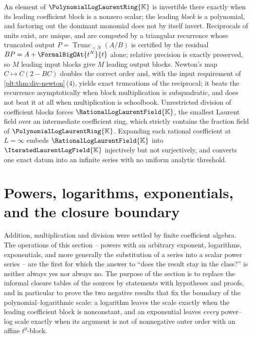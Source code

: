 \documentclass[11pt,oneside]{article}
\theoremstyle{plain}
\theoremstyle{definition}
\theoremstyle{remark}
\newcommand{\K}{\mathbb{K}}
\newcommand{\PLlau}{\PolynomialLogLaurentRing{\K}}       %
\newcommand{\PLrat}{\RationalLogLaurentField{\K}}        %
\newcommand{\PLit}{\IteratedLaurentLogField{\K}}         %
\newcommand{\Trunc}[2]{\operatorname{Trunc}_{<#2}#1}     %
\begin{document}
\begin{summarybox}
An element of \(\PLlau\) is invertible there exactly when its leading
coefficient block is a nonzero scalar; the leading \emph{block} is a
polynomial, and factoring out the dominant monomial does not by itself invert.
Reciprocals of units exist, are unique, and are computed by a triangular
recurrence whose truncated output \(P=\Trunc{(A/B)}{N}\) is certified by the
residual \(BP=A+\FormalBigOAt{t^{N}}{t}\) alone; relative precision is exactly
preserved, so \(M\) leading input blocks give \(M\) leading output blocks.
Newton's map \(C\mapsto C(2-BC)\) doubles the correct order and, with the input
requirement of \cref{plt:thm:div-newton}\,(4), yields exact truncations of the
reciprocal; it beats the recurrence asymptotically when block multiplication is
subquadratic, and does not beat it at all when multiplication is schoolbook.
Unrestricted division of coefficient blocks forces \(\PLrat\),
the smallest Laurent field over an intermediate coefficient ring, which
strictly contains the fraction field of \(\PLlau\).  Expanding each rational
coefficient at \(L=\infty\) embeds \(\PLrat\) into \(\PLit\) injectively but
not surjectively, and converts one exact datum into an infinite series with no
uniform analytic threshold.
\end{summarybox}

\section{Powers, logarithms, exponentials, and the closure boundary}
\label{plt:sec:elementary}

Addition, multiplication and division were settled by finite coefficient
algebra.  The operations of this section -- powers with an arbitrary exponent,
logarithms, exponentials, and more generally the substitution of a series into
a scalar power series -- are the first for which the answer to ``does the
result stay in the class?'' is neither always yes nor always no.  The purpose
of the section is to replace the informal closure tables of the sources by
statements with hypotheses and proofs, and in particular to prove the two
negative results that fix the boundary of the polynomial--logarithmic scale:
a logarithm leaves the scale exactly when the leading coefficient block is
nonconstant, and an exponential leaves \emph{every} power--log scale exactly
when its argument is not of nonnegative outer order with an affine
\(t^{0}\)-block.
\end{document}
